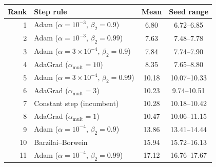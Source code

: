 \begin{tabular}{rlcc}
\toprule
Rank & Step rule & Mean & Seed range \\
\midrule
1 & Adam ($\alpha=10^{-3}$, $\beta_2=0.9$) & 6.80 & 6.72--6.85 \\
2 & Adam ($\alpha=10^{-3}$, $\beta_2=0.99$) & 7.63 & 7.48--7.78 \\
3 & Adam ($\alpha=3\times10^{-4}$, $\beta_2=0.9$) & 7.84 & 7.74--7.90 \\
4 & AdaGrad ($\alpha_{\mathrm{mult}}=10$) & 8.35 & 7.65--8.80 \\
5 & Adam ($\alpha=3\times10^{-4}$, $\beta_2=0.99$) & 10.18 & 10.07--10.33 \\
6 & AdaGrad ($\alpha_{\mathrm{mult}}=3$) & 10.23 & 9.74--10.51 \\
7 & Constant step (incumbent) & 10.28 & 10.18--10.42 \\
8 & AdaGrad ($\alpha_{\mathrm{mult}}=1$) & 10.47 & 10.06--11.15 \\
9 & Adam ($\alpha=10^{-4}$, $\beta_2=0.9$) & 13.86 & 13.41--14.44 \\
10 & Barzilai--Borwein & 15.94 & 15.72--16.13 \\
11 & Adam ($\alpha=10^{-4}$, $\beta_2=0.99$) & 17.12 & 16.76--17.67 \\
\bottomrule
\end{tabular}
